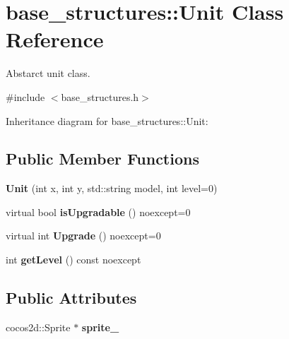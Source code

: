 \hypertarget{classbase__structures_1_1Unit}{}\section{base\+\_\+structures\+:\+:Unit Class Reference}
\label{classbase__structures_1_1Unit}


Abstarct unit class.  




{\ttfamily \#include $<$base\+\_\+structures.\+h$>$}



Inheritance diagram for base\+\_\+structures\+:\+:Unit\+:
\subsection*{Public Member Functions}
\begin{DoxyCompactItemize}
\item 
\mbox{\label{classbase__structures_1_1Unit_ad4c134c8856516983354e7c78e900e46}} 
{\bfseries Unit} (int x, int y, std\+::string model, int level=0)
\item 
\mbox{\label{classbase__structures_1_1Unit_a299253c7822956d463c647784b96bf98}} 
virtual bool {\bfseries is\+Upgradable} () noexcept=0
\item 
\mbox{\label{classbase__structures_1_1Unit_ae594bf5b291faac34807ceaf136f1282}} 
virtual int {\bfseries Upgrade} () noexcept=0
\item 
\mbox{\label{classbase__structures_1_1Unit_a639e524b1487cbebd9e776c578d46eac}} 
int {\bfseries get\+Level} () const noexcept
\end{DoxyCompactItemize}
\subsection*{Public Attributes}
\begin{DoxyCompactItemize}
\item 
\mbox{\label{classbase__structures_1_1Unit_a2bfb91dc300da8829258f765ac1f1532}} 
cocos2d\+::\+Sprite $\ast$ {\bfseries sprite\+\_\+}
\end{DoxyCompactItemize}
